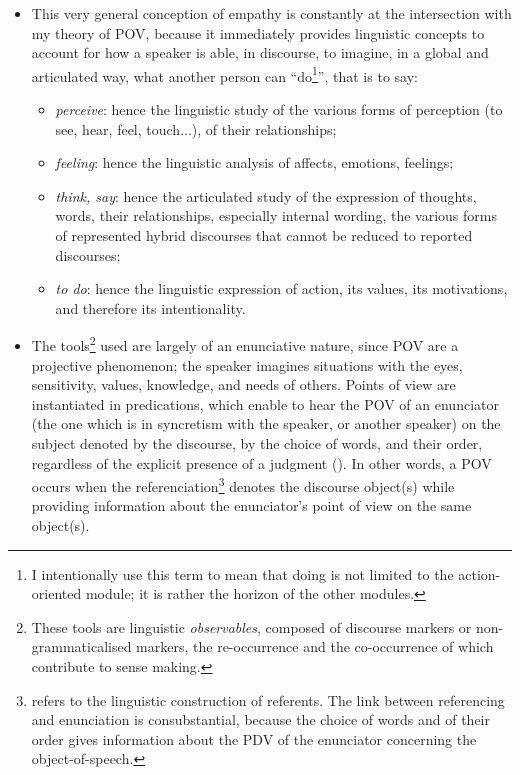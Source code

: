 \documentclass[output=paper]{langscibook}
\begin{document}
\begin{itemize}
\item This very general conception of empathy is constantly at the intersection with my theory of POV, because it immediately provides linguistic concepts to account for how a speaker is able, in discourse, to imagine, in a global and articulated way, what another person can “do\footnote{I intentionally use this term to mean that doing is not limited to the action-oriented module; it is rather the horizon of the other modules.}”, that is to say:
\begin{itemize}

\item \textit{perceive}: hence the linguistic study of the various forms of perception (to see, hear, feel, touch...), of their relationships;

\item \textit{feeling}: hence the linguistic analysis of affects, emotions, feelings; 

\item \textit{think, say}: hence the articulated study of the expression of thoughts, words, their relationships, especially internal wording, the various forms of represented hybrid discourses that cannot be reduced to reported discourses;

\item \textit{to do}: hence the linguistic expression of action, its values, its motivations, and therefore its intentionality. 

\end{itemize}

\item The tools\footnote{These tools are linguistic \textit{observables}, composed of discourse markers or non-grammaticalised markers, the re-occurrence and the co-occurrence of which contribute to sense making.} used are largely of an enunciative nature, since POV are a projective phenomenon; the speaker imagines situations with the eyes, sensitivity, values, knowledge, and needs of others. Points of view are instantiated in predications, which enable to hear the POV of an enunciator (the one which is in syncretism with the speaker, or another speaker) on the subject denoted by the discourse, by the choice of words, and their order, regardless of the explicit presence of a judgment (\citealt{Rabatel2009, Rabatel2016}). In other words, a POV occurs when the referenciation\footnote{\citet[34]{Danon-Boileau1982} refers to the linguistic construction of referents. The link between referencing and enunciation is consubstantial, because the choice of words and of their order gives information about the PDV of the enunciator concerning the object-of-speech.} denotes the discourse object(s) while providing information about the enunciator's point of view on the same object(s). 


\end{itemize}
\end{document}
